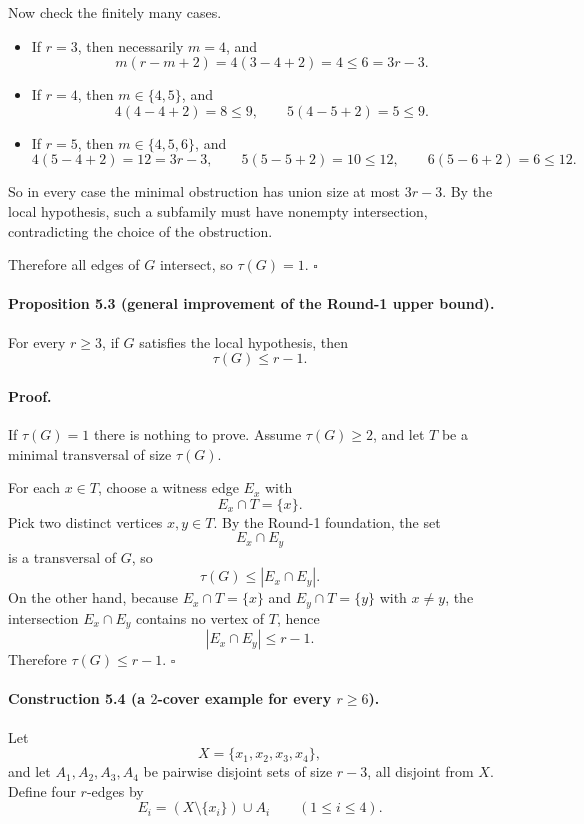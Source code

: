 Now check the finitely many cases.

\begin{itemize}
\item If $r=3$, then necessarily $m=4$, and
\[
m(r-m+2)=4(3-4+2)=4\le 6=3r-3.
\]
\item If $r=4$, then $m\in\{4,5\}$, and
\[
4(4-4+2)=8\le 9,\qquad 5(4-5+2)=5\le 9.
\]
\item If $r=5$, then $m\in\{4,5,6\}$, and
\[
4(5-4+2)=12=3r-3,\qquad 5(5-5+2)=10\le 12,\qquad 6(5-6+2)=6\le 12.
\]
\end{itemize}

So in every case the minimal obstruction has union size at most $3r-3$. By the local hypothesis, such a subfamily must have nonempty intersection, contradicting the choice of the obstruction.

Therefore all edges of $G$ intersect, so $\tau(G)=1$.
\hfill $\square$

\paragraph{Proposition 5.3 (general improvement of the Round-1 upper bound).}
For every $r\ge 3$, if $G$ satisfies the local hypothesis, then
\[
\tau(G)\le r-1.
\]

\paragraph{Proof.}
If $\tau(G)=1$ there is nothing to prove. Assume $\tau(G)\ge 2$, and let $T$ be a minimal transversal of size $\tau(G)$.

For each $x\in T$, choose a witness edge $E_x$ with
\[
E_x\cap T=\{x\}.
\]
Pick two distinct vertices $x,y\in T$. By the Round-1 foundation, the set
\[
E_x\cap E_y
\]
is a transversal of $G$, so
\[
\tau(G)\le |E_x\cap E_y|.
\]
On the other hand, because $E_x\cap T=\{x\}$ and $E_y\cap T=\{y\}$ with $x\ne y$, the intersection $E_x\cap E_y$ contains no vertex of $T$, hence
\[
|E_x\cap E_y|\le r-1.
\]
Therefore $\tau(G)\le r-1$.
\hfill $\square$

\paragraph{Construction 5.4 (a $2$-cover example for every $r\ge 6$).}
Let
\[
X=\{x_1,x_2,x_3,x_4\},
\]
and let $A_1,A_2,A_3,A_4$ be pairwise disjoint sets of size $r-3$, all disjoint from $X$.
Define four $r$-edges by
\[
E_i=(X\setminus \{x_i\})\cup A_i
\qquad (1\le i\le 4).
\]

